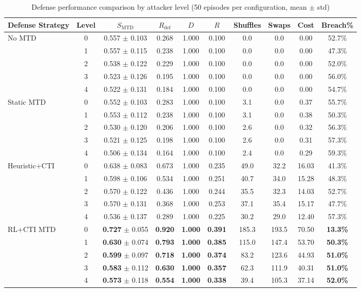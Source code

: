 
\begin{table}[htbp]
\centering
\caption{Defense performance comparison by attacker level (50 episodes per configuration, mean $\pm$ std)}
\label{tab:comparison_results}
\begin{tabular}{@{}lccccccccc@{}}
\toprule
\textbf{Defense Strategy} & \textbf{Level} & $S_{\text{MTD}}$ & $R_{\text{def}}$ & $D$ & $R$ & Shuffles & Swaps & Cost & Breach\% \\
\midrule
\multirow{5}{*}{No MTD}
& 0 & 0.557 $\pm$ 0.103 & 0.268 & 1.000 & 0.100 & 0.0 & 0.0 & 0.00 & 52.7\% \\
& 1 & 0.557 $\pm$ 0.115 & 0.238 & 1.000 & 0.100 & 0.0 & 0.0 & 0.00 & 47.3\% \\
& 2 & 0.538 $\pm$ 0.122 & 0.229 & 1.000 & 0.100 & 0.0 & 0.0 & 0.00 & 52.0\% \\
& 3 & 0.523 $\pm$ 0.126 & 0.195 & 1.000 & 0.100 & 0.0 & 0.0 & 0.00 & 56.0\% \\
& 4 & 0.522 $\pm$ 0.131 & 0.184 & 1.000 & 0.100 & 0.0 & 0.0 & 0.00 & 54.7\% \\
\midrule
\multirow{5}{*}{Static MTD}
& 0 & 0.552 $\pm$ 0.103 & 0.283 & 1.000 & 0.100 & 3.1 & 0.0 & 0.37 & 55.7\% \\
& 1 & 0.553 $\pm$ 0.112 & 0.238 & 1.000 & 0.100 & 3.1 & 0.0 & 0.38 & 50.3\% \\
& 2 & 0.530 $\pm$ 0.120 & 0.206 & 1.000 & 0.100 & 2.6 & 0.0 & 0.32 & 56.3\% \\
& 3 & 0.521 $\pm$ 0.125 & 0.198 & 1.000 & 0.100 & 2.6 & 0.0 & 0.31 & 57.3\% \\
& 4 & 0.506 $\pm$ 0.134 & 0.164 & 1.000 & 0.100 & 2.4 & 0.0 & 0.29 & 59.3\% \\
\midrule
\multirow{5}{*}{Heuristic+CTI}
& 0 & 0.638 $\pm$ 0.083 & 0.673 & 1.000 & 0.235 & 49.0 & 32.2 & 16.03 & 41.3\% \\
& 1 & 0.598 $\pm$ 0.106 & 0.534 & 1.000 & 0.251 & 40.7 & 34.0 & 15.28 & 48.3\% \\
& 2 & 0.570 $\pm$ 0.122 & 0.436 & 1.000 & 0.244 & 35.5 & 32.3 & 14.03 & 52.7\% \\
& 3 & 0.570 $\pm$ 0.131 & 0.368 & 1.000 & 0.253 & 37.1 & 35.4 & 15.17 & 47.7\% \\
& 4 & 0.536 $\pm$ 0.137 & 0.289 & 1.000 & 0.225 & 30.2 & 29.0 & 12.40 & 57.3\% \\
\midrule
\multirow{5}{*}{RL+CTI MTD}
& 0 & \textbf{0.727} $\pm$ 0.055 & \textbf{0.920} & \textbf{1.000} & \textbf{0.391} & 185.3 & 193.5 & 70.50 & \textbf{13.3\%} \\
& 1 & \textbf{0.630} $\pm$ 0.074 & \textbf{0.793} & \textbf{1.000} & \textbf{0.385} & 115.0 & 147.4 & 53.70 & \textbf{50.3\%} \\
& 2 & \textbf{0.599} $\pm$ 0.097 & \textbf{0.718} & \textbf{1.000} & \textbf{0.374} & 83.2 & 123.6 & 44.93 & \textbf{51.0\%} \\
& 3 & \textbf{0.583} $\pm$ 0.112 & \textbf{0.630} & \textbf{1.000} & \textbf{0.357} & 62.3 & 111.9 & 40.31 & \textbf{51.0\%} \\
& 4 & \textbf{0.573} $\pm$ 0.118 & \textbf{0.554} & \textbf{1.000} & \textbf{0.338} & 39.4 & 105.3 & 37.14 & \textbf{52.0\%} 
\bottomrule
\end{tabular}
\end{table}
